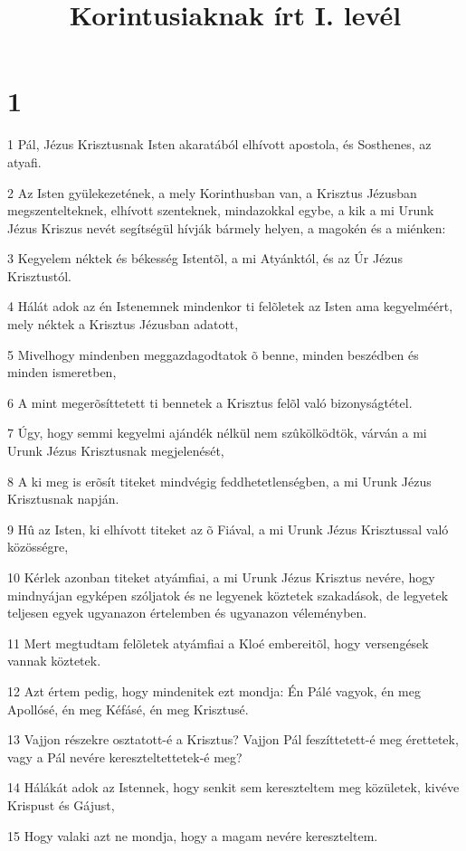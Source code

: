 

\title{Korintusiaknak írt I. levél}


\chapter{1}

\par 1 Pál, Jézus Krisztusnak Isten akaratából elhívott apostola, és Sosthenes,  az atyafi.
\par 2 Az Isten gyülekezetének, a mely Korinthusban van, a Krisztus Jézusban megszentelteknek, elhívott szenteknek, mindazokkal egybe, a kik a mi Urunk Jézus Kriszus nevét segítségül hívják bármely helyen, a magokén és a miénken:
\par 3 Kegyelem néktek és békesség Istentõl, a mi Atyánktól, és az Úr Jézus Krisztustól.
\par 4 Hálát adok az én Istenemnek mindenkor ti felõletek az Isten ama kegyelméért, mely néktek a Krisztus Jézusban adatott,
\par 5 Mivelhogy mindenben meggazdagodtatok õ benne, minden beszédben és minden  ismeretben,
\par 6 A mint megerõsíttetett ti bennetek a Krisztus felõl való bizonyságtétel.
\par 7 Úgy, hogy semmi kegyelmi ajándék nélkül nem szûkölködtök, várván a mi Urunk Jézus  Krisztusnak megjelenését,
\par 8 A ki meg is erõsít titeket mindvégig  feddhetetlenségben, a mi Urunk Jézus Krisztusnak napján.
\par 9 Hû az Isten, ki elhívott  titeket az õ Fiával, a mi Urunk Jézus Krisztussal való közösségre,
\par 10 Kérlek azonban titeket atyámfiai, a mi Urunk Jézus Krisztus nevére, hogy mindnyájan egyképen szóljatok és ne legyenek köztetek szakadások, de legyetek teljesen egyek ugyanazon értelemben  és ugyanazon véleményben.
\par 11 Mert megtudtam felõletek atyámfiai a Kloé embereitõl, hogy versengések vannak köztetek.
\par 12 Azt értem pedig, hogy mindenitek ezt mondja: Én Pálé vagyok,  én meg Apollósé, én meg Kéfásé, én meg Krisztusé.
\par 13 Vajjon részekre osztatott-é a Krisztus? Vajjon Pál feszíttetett-é meg érettetek, vagy a Pál nevére kereszteltettetek-é meg?
\par 14 Hálákát adok az Istennek, hogy senkit sem kereszteltem meg közületek, kivéve Krispust  és Gájust,
\par 15 Hogy valaki azt ne mondja, hogy a magam nevére kereszteltem.
